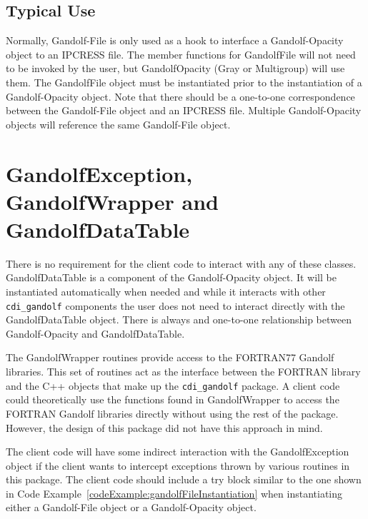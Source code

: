 \documentclass[11pt]{nmemo}
\begin{document}

\subsection{Typical Use}

Normally, Gandolf-File is only used as a hook to interface a
Gandolf-Opacity object to an IPCRESS file.  The member functions for
Gandolf\-File will not need to be invoked by the user, but
Gandolf\-Opacity (Gray or Multigroup) will use them.  The
Gandolf\-File object must be instantiated prior to the instantiation
of a Gandolf-Opacity object.  Note that there should be a one-to-one
correspondence between the Gandolf-File object and an IPCRESS file.
Multiple Gandolf-Opacity objects will reference the same Gandolf-File
object. 


\section{GandolfException, GandolfWrapper and GandolfDataTable}

There is no requirement for the client code to interact with any of
these classes.  GandolfDataTable is a component of the Gandolf-Opacity
object.  It will be instantiated automatically when needed and while
it interacts with other \texttt{cdi\_gandolf} components the user does
not need to interact directly with the GandolfDataTable object.  There
is always and one-to-one relationship between Gandolf-Opacity and
GandolfDataTable.

The GandolfWrapper routines provide access to the FORTRAN77 Gandolf
libraries.  This set of routines act as the interface between the
FORTRAN library and the C++ objects that make up the
\texttt{cdi\_gandolf} package.  A client code could theoretically use
the functions found in GandolfWrapper to access the FORTRAN Gandolf
libraries directly without using the rest of the package.  However,
the design of this package did not have this approach in mind.

The client code will have some indirect interaction with the
GandolfException object if the client wants to intercept exceptions
thrown by various routines in this package.  The client code should
include a try block similar to the one shown in Code
Example~\ref{codeExample:gandolfFileInstantiation} when instantiating
either a Gandolf-File object or a Gandolf-Opacity object. 
\end{document}
